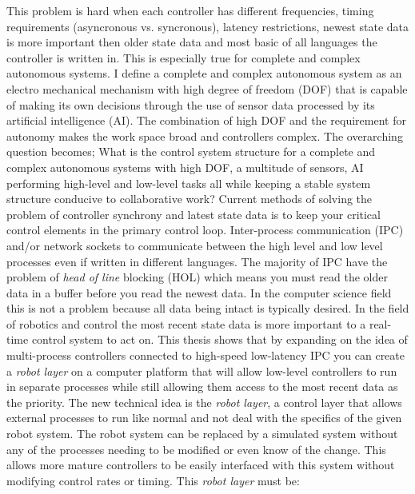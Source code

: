 This problem is hard when each controller has different frequencies, timing requirements (asyncronous vs. syncronous), latency restrictions, newest state data is more important then older state data and most basic of all languages the controller is written in.
This is especially true for complete and complex autonomous systems.
I define a complete and complex autonomous system as an electro mechanical mechanism with high degree of freedom (DOF) that is capable of making its own decisions through the use of sensor data processed by its artificial intelligence (AI).
The combination of high DOF and the requirement for autonomy makes the work space broad and controllers complex.
The overarching question becomes; What is the control system structure for a complete and complex autonomous systems with high DOF, a multitude of sensors, AI performing high-level and low-level tasks all while keeping a stable system structure conducive to collaborative work?
Current methods of solving the problem of controller synchrony and latest state data is to keep your critical control elements in the primary control loop.
Inter-process communication (IPC) and/or network sockets to communicate between the high level and low level processes even if written in different languages.
The majority of IPC have the problem of \textit{head of line} blocking (HOL) which means you must read the older data in a buffer before you read the newest data.
In the computer science field this is not a problem because all data being intact is typically desired.  
In the field of robotics and control the most recent state data is more important to a real-time control system to act on.
This thesis shows that by expanding on the idea of multi-process controllers connected to high-speed low-latency IPC you can create a \textit{robot layer} on a computer platform that will allow low-level controllers to run in separate processes while still allowing them access to the most recent data as the priority.
The new technical idea is the \textit{robot layer}, a control layer that allows external processes to run like normal and not deal with the specifics of the given robot system.
The robot system can be replaced by a simulated system without any of the processes needing to be modified or even know of the change.
This allows more mature controllers to be easily interfaced with this system without modifying control rates or timing.
This \textit{robot layer} must be:
